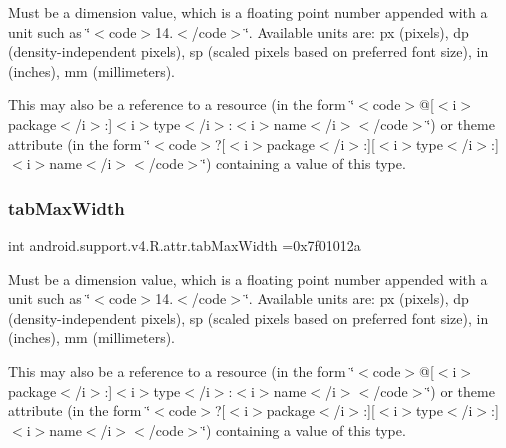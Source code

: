 Must be a dimension value, which is a floating point number appended with a unit such as \char`\"{}$<$code$>$14.\+5sp$<$/code$>$\char`\"{}. Available units are\+: px (pixels), dp (density-\/independent pixels), sp (scaled pixels based on preferred font size), in (inches), mm (millimeters). 

This may also be a reference to a resource (in the form \char`\"{}$<$code$>$@\mbox{[}$<$i$>$package$<$/i$>$\+:\mbox{]}$<$i$>$type$<$/i$>$\+:$<$i$>$name$<$/i$>$$<$/code$>$\char`\"{}) or theme attribute (in the form \char`\"{}$<$code$>$?\mbox{[}$<$i$>$package$<$/i$>$\+:\mbox{]}\mbox{[}$<$i$>$type$<$/i$>$\+:\mbox{]}$<$i$>$name$<$/i$>$$<$/code$>$\char`\"{}) containing a value of this type. \mbox{\label{classandroid_1_1support_1_1v4_1_1R_1_1attr_a926a07daeb0c2ad7c63bcf15ce23fc3c}} 
\subsubsection{\texorpdfstring{tab\+Max\+Width}{tabMaxWidth}}
{\footnotesize\ttfamily int android.\+support.\+v4.\+R.\+attr.\+tab\+Max\+Width =0x7f01012a\hspace{0.3cm}{\ttfamily [static]}}

Must be a dimension value, which is a floating point number appended with a unit such as \char`\"{}$<$code$>$14.\+5sp$<$/code$>$\char`\"{}. Available units are\+: px (pixels), dp (density-\/independent pixels), sp (scaled pixels based on preferred font size), in (inches), mm (millimeters). 

This may also be a reference to a resource (in the form \char`\"{}$<$code$>$@\mbox{[}$<$i$>$package$<$/i$>$\+:\mbox{]}$<$i$>$type$<$/i$>$\+:$<$i$>$name$<$/i$>$$<$/code$>$\char`\"{}) or theme attribute (in the form \char`\"{}$<$code$>$?\mbox{[}$<$i$>$package$<$/i$>$\+:\mbox{]}\mbox{[}$<$i$>$type$<$/i$>$\+:\mbox{]}$<$i$>$name$<$/i$>$$<$/code$>$\char`\"{}) containing a value of this type. \mbox{\label{classandroid_1_1support_1_1v4_1_1R_1_1attr_af1e0e4313ae239f4f9b041b85893ed7e}} 
